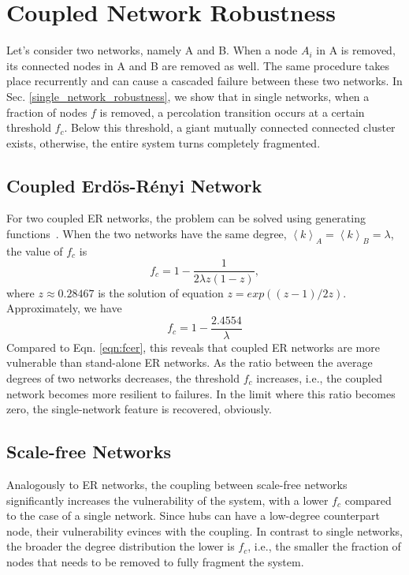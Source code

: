 \documentclass[11pt]{article}
\newcommand{\expbracket}[1]{\left \langle #1  \right \rangle}
\begin{document}
\section{Coupled Network Robustness}
Let's consider two networks, namely A and B. When a node $A_i$ in A is removed, its connected nodes in A and B are removed as well. The same procedure takes place recurrently and can cause a cascaded failure between these two networks. In Sec. \ref{single_network_robustness}, we show that in single networks, when a fraction of nodes $f$ is removed, a percolation transition occurs at a certain threshold $f_c$. Below this threshold, a giant mutually connected connected cluster exists, otherwise, the entire system turns completely fragmented.
\subsection{Coupled Erd\"{o}s-R\'{e}nyi Network}
For two coupled ER networks, the problem can be solved using generating functions~\cite{shao2008fractal}. When the two networks have the same degree, $\expbracket{k}_A = \expbracket{k}_B = \lambda$, the value of $f_c$ is 
\begin{equation}
    f_c = 1 - \frac{1}{2 \lambda z(1-z)}, 
\end{equation}
where $z \approx 0.28467 $ is the solution of equation $z = exp((z-1) / 2z)$. Approximately, we have \begin{equation}
    f_c = 1 - \frac{2.4554}{\lambda}
\end{equation}
Compared to Eqn. \ref{eqn:fcer}, this reveals that coupled ER networks are more vulnerable than stand-alone ER networks. As the ratio between the average degrees of two networks decreases, the threshold $f_c$ increases, i.e., the coupled network becomes more resilient to failures. In the limit where this ratio becomes zero, the single-network feature is recovered, obviously. 

\subsection{Scale-free Networks}
 Analogously to ER networks, the coupling between scale-free networks significantly increases the vulnerability of the system, with a lower $f_c$ compared to the case of a single network. Since hubs can have a low-degree counterpart node, their vulnerability evinces with the coupling. In contrast to single networks, the broader the degree distribution the lower is $f_c$, i.e., the smaller the fraction of nodes that needs to be removed to fully fragment the system.
 
\end{document}
